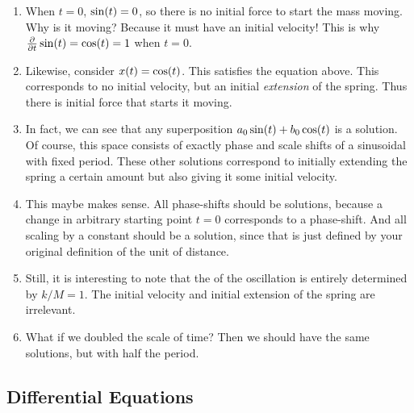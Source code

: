 \begin{enumerate}
  \item When $t = 0$, $\sin\mathopen{}\left( {t} \right)\mathclose{} = 0$, so there is no initial force to
  start the mass moving. Why is it moving? Because it must have an
  initial velocity! This is why $\frac{\partial }{\partial t} \sin\mathopen{}\left( {t} \right)\mathclose{} = \cos\mathopen{}\left( {t} \right)\mathclose{} = 1$
  when $t = 0$.

  \item Likewise, consider $x\mathopen{}\left( {t} \right)\mathclose{} = \cos\mathopen{}\left( {t} \right)\mathclose{}$. This satisfies the
  equation above. This corresponds to no initial velocity, but an
  initial \emph{extension} of the spring. Thus there is initial force
  that starts it moving.

  \item In fact, we can see that any superposition $a_0 \sin\mathopen{}\left( {t} \right)\mathclose{} + b_0
  \cos\mathopen{}\left( {t} \right)\mathclose{}$ is a solution. Of course, this space consists of exactly
  phase and scale shifts of a sinusoidal with fixed period. These other
  solutions correspond to initially extending the spring a certain
  amount but also giving it some initial velocity.

  \item This maybe makes sense. All phase-shifts should be solutions,
  because a change in arbitrary starting point $t = 0$ corresponds to a
  phase-shift. And all scaling by a constant should be a solution, since
  that is just defined by your original definition of the unit of
  distance.

  \item Still, it is interesting to note that the  of the
  oscillation is entirely determined by $k/M = 1$. The initial velocity
  and initial extension of the spring are irrelevant.

  \item What if we doubled the scale of time? Then we should have the
  same solutions, but with half the period. 
\end{enumerate}

\subsection{Differential Equations}

